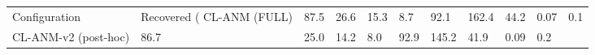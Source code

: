 \begin{tabular}{llllllllll}
\toprule
Configuration & Recovered (%
\midrule
CL-ANM (FULL) & 87.5 & 26.6 & 15.3 & 8.7 & 92.1 & 162.4 & 44.2 & 0.07 & 0.1 \\
CL-ANM-v2 (post-hoc) & 86.7 & 25.0 & 14.2 & 8.0 & 92.9 & 145.2 & 41.9 & 0.09 & 0.2 \\
\bottomrule
\end{tabular}
